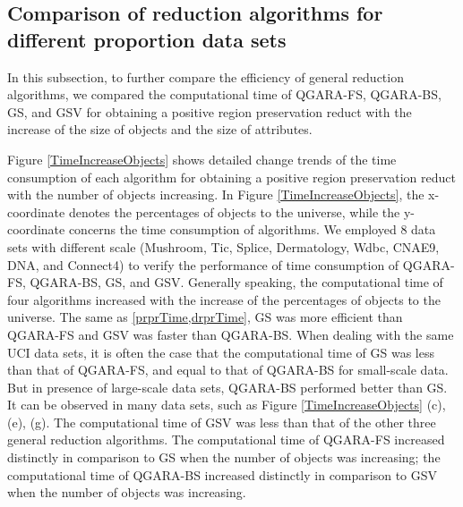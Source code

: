 \documentclass[review]{elsarticle}
\begin{document}
	\subsection{Comparison of reduction algorithms for different proportion data sets}
		\par In this subsection, to further compare the efficiency of general reduction algorithms, we compared the computational time of QGARA-FS, QGARA-BS, GS, and GSV for obtaining a positive region preservation reduct with the increase of the size of objects and the size of attributes. 
		\par Figure \ref{TimeIncreaseObjects} shows detailed change trends of the time consumption of each algorithm for obtaining a positive region preservation reduct with the number of objects increasing. In Figure \ref{TimeIncreaseObjects}, the x-coordinate denotes the percentages of objects to the universe, while the y-coordinate concerns the time consumption of algorithms. We employed 8 data sets with different scale (Mushroom, Tic, Splice, Dermatology, Wdbc, CNAE9, DNA, and Connect4) to verify the performance of time consumption of QGARA-FS, QGARA-BS, GS, and GSV. Generally speaking, the computational time of four algorithms increased with the increase of the percentages of objects to the universe. The same as \cref{prprTime,drprTime}, GS was more efficient than QGARA-FS and GSV was faster than QGARA-BS.
		When dealing with the same UCI data sets, it is often the case that the computational time of GS was less than that of QGARA-FS, and equal to that of QGARA-BS for small-scale data. But in presence of large-scale data sets, QGARA-BS performed better than GS. It can be observed in many data sets, such as Figure \ref{TimeIncreaseObjects} (c), (e), (g).  The computational time of GSV was less than that of the other three general reduction algorithms. The computational time of QGARA-FS increased distinctly in comparison to GS when the number of objects was increasing; the computational time of QGARA-BS increased distinctly in comparison to GSV when the number of objects was increasing. 
\end{document}
